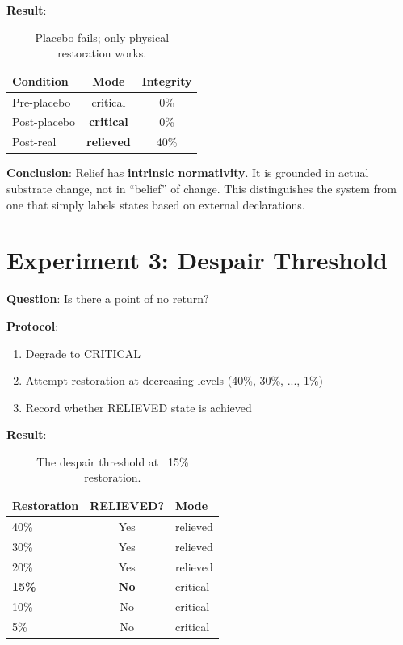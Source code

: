 \documentclass[a4paper,11pt,twocolumn]{article}
\begin{document}
\textbf{Result}:
\begin{table}[h]
\centering
\begin{tabular}{@{}lcc@{}}
\toprule
Condition & Mode & Integrity \\ \midrule
Pre-placebo & critical & 0\% \\
Post-placebo & \textbf{critical} & 0\% \\
Post-real & \textbf{relieved} & 40\% \\
\bottomrule
\end{tabular}
\caption{Placebo fails; only physical restoration works.}
\end{table}

\textbf{Conclusion}: Relief has \textbf{intrinsic normativity}. It is grounded in actual substrate change, not in ``belief'' of change. This distinguishes the system from one that simply labels states based on external declarations.

\section{Experiment 3: Despair Threshold}

\textbf{Question}: Is there a point of no return?

\textbf{Protocol}:
\begin{enumerate}
    \item Degrade to CRITICAL
    \item Attempt restoration at decreasing levels (40\%, 30\%, ..., 1\%)
    \item Record whether RELIEVED state is achieved
\end{enumerate}

\textbf{Result}:
\begin{table}[h]
\centering
\begin{tabular}{@{}lcl@{}}
\toprule
Restoration & RELIEVED? & Mode \\ \midrule
40\% & Yes & relieved \\
30\% & Yes & relieved \\
20\% & Yes & relieved \\
\textbf{15\%} & \textbf{No} & critical \\
10\% & No & critical \\
5\% & No & critical \\
\bottomrule
\end{tabular}
\caption{The despair threshold at ~15\% restoration.}
\end{table}
\end{document}
